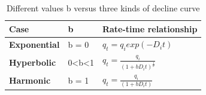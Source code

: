 \documentclass[12pt,a4paper]{report}
\begin{document}
\begin{table}[H]
\centering
\caption{Different values b versus three kinds of decline curve}
\begin{tabular}{@{}lll@{}}
\toprule
\textbf{Case}        & \textbf{b}                & \textbf{Rate-time relationship}                   \\ \midrule
\textbf{Exponential} & b = 0                     & $q_{t} = q_{i}exp(-D_{i}t)$                       \\
\textbf{Hyperbolic}  & 0\textless{}b\textless{}1 & $q_{t} = \frac{q_{i}}{(1+bD_{i}t)^{\frac{1}{b}}}$ \\
\textbf{Harmonic}    & b = 1                     & $q_{t} = \frac{q_{i}}{(1+bD_{i}t)}$               \\ \bottomrule
\end{tabular}
\end{table}
\end{document}

